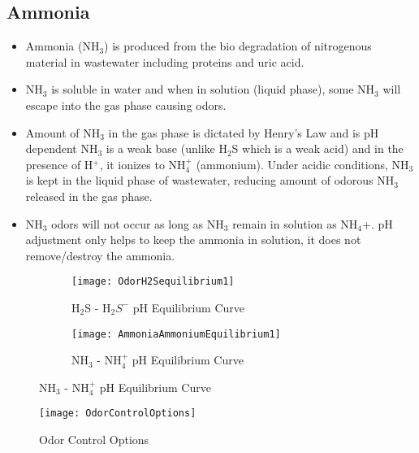 \subsection{Ammonia}
\begin{itemize}
\item Ammonia (NH$_3$) is produced from the bio degradation of nitrogenous material in wastewater including proteins and uric acid.
\item NH$_3$ is soluble in water and when in solution (liquid phase), some NH$_3$ will escape into the gas phase causing odors.
\item Amount of NH$_3$ in the gas phase is dictated by Henry’s Law and is pH dependent
NH$_3$ is a weak base (unlike H$_2$S which is a weak acid) and in the presence of H$^+$, it ionizes to NH$_4^+$ (ammonium).
Under acidic conditions, NH$_3$ is kept in the liquid phase of wastewater, reducing amount of odorous NH$_3$  released in the gas phase.
\item NH$_3$ odors will not occur as long as NH$_3$ remain in solution as NH$_4$+.
pH adjustment only helps to keep the ammonia in solution, it does not remove/destroy the ammonia.
\end{itemize}

\begin{figure}[h!]
  \centering
  \begin{subfigure}[b]{\linewidth}
    \texttt{[image: OdorH2Sequilibrium1]}
    \caption{H$_2$S - H$_2S^-$ pH Equilibrium Curve}
  \end{subfigure}
  \hspace{1cm}
  \begin{subfigure}[b]{\linewidth}
    \texttt{[image: AmmoniaAmmoniumEquilibrium1]}
    \caption{NH$_3$ - NH$_4^+$ pH Equilibrium Curve}
  \end{subfigure}
\end{figure}
	
%	

\begin{sidewaysfigure}[!htp]
	\begin{center}
		\texttt{[image: OdorControlOptions]}
			\caption{Odor Control Options}
	\end{center}
\end{sidewaysfigure}

